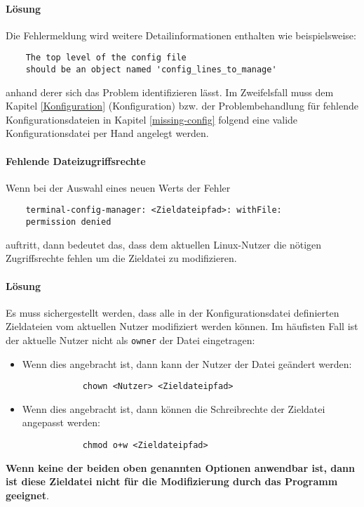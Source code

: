 \paragraph{Lösung}
Die Fehlermeldung wird weitere Detailinformationen enthalten wie beispielsweise:

\begin{verbatim}
    The top level of the config file
    should be an object named 'config_lines_to_manage'
\end{verbatim}

anhand derer sich das Problem identifizieren lässt. Im Zweifelsfall muss dem
Kapitel \ref{Konfiguration} (Konfiguration) bzw. der Problembehandlung für
fehlende Konfigurationsdateien in Kapitel \ref{missing-config} folgend eine valide Konfigurationsdatei
per Hand angelegt werden.

\paragraph{Fehlende Dateizugriffsrechte} Wenn bei der Auswahl eines neuen Werts
der Fehler

\begin{verbatim}
    terminal-config-manager: <Zieldateipfad>: withFile:
    permission denied
\end{verbatim}

auftritt, dann bedeutet das, dass dem aktuellen Linux-Nutzer die nötigen
Zugriffsrechte fehlen um die Zieldatei zu modifizieren.

\paragraph{Lösung}
Es muss sichergestellt werden, dass alle in der Konfigurationsdatei definierten
Zieldateien vom aktuellen Nutzer modifiziert werden können. Im häufisten Fall
ist der aktuelle Nutzer nicht als \texttt{owner} der Datei eingetragen:

\begin{itemize}
    \item Wenn dies angebracht ist, dann kann der Nutzer der Datei geändert werden:
          \begin{verbatim}
            chown <Nutzer> <Zieldateipfad>
        \end{verbatim}
    \item Wenn dies angebracht ist, dann können die Schreibrechte der Zieldatei
          angepasst werden:
          \begin{verbatim}
            chmod o+w <Zieldateipfad>
        \end{verbatim}
\end{itemize}

\textbf{Wenn keine der beiden oben genannten Optionen anwendbar ist, dann ist diese
    Zieldatei nicht für die Modifizierung durch das Programm geeignet}.
